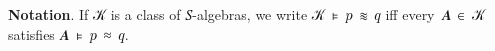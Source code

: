 \noindent \textbf{Notation}. If \ab 𝒦 is a class of \ab 𝑆-algebras, we write \ab 𝒦~\af ⊧~\ab 𝑝~\af ≋~\ab 𝑞 iff every~\ab 𝑨~\af ∈~\ab 𝒦 satisfies \ab 𝑨~\af ⊧~\ab 𝑝~\af ≈~\ab 𝑞.

